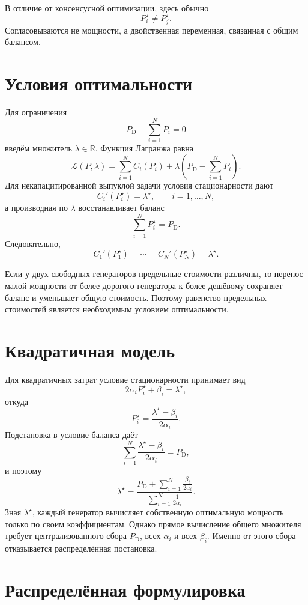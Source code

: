 В отличие от консенсусной оптимизации, здесь обычно
\[
    P_i^\star\ne P_j^\star.
\]
Согласовываются не мощности, а двойственная переменная, связанная с
общим балансом.

\section{Условия оптимальности}

Для ограничения
\[
    P_{\mathrm D}-\sum_{i=1}^{N}P_i=0
\]
введём множитель \(\lambda\in\mathbb R\). Функция Лагранжа равна
\[
    \mathcal L(P,\lambda)
    =
    \sum_{i=1}^{N}C_i(P_i)
    +
    \lambda
    \left(
        P_{\mathrm D}-\sum_{i=1}^{N}P_i
    \right).
\]
Для некапацитированной выпуклой задачи условия стационарности дают
\[
    C_i'(P_i^\star)=\lambda^\star,
    \qquad i=1,\ldots,N,
\]
а производная по \(\lambda\) восстанавливает баланс
\[
    \sum_{i=1}^{N}P_i^\star=P_{\mathrm D}.
\]
Следовательно,
\[
    C_1'(P_1^\star)
    =
    \cdots
    =
    C_N'(P_N^\star)
    =
    \lambda^\star.
\]

Если у двух свободных генераторов предельные стоимости различны, то
перенос малой мощности от более дорогого генератора к более дешёвому
сохраняет баланс и уменьшает общую стоимость. Поэтому равенство
предельных стоимостей является необходимым условием оптимальности.

\section{Квадратичная модель}

Для квадратичных затрат условие стационарности принимает вид
\[
    2\alpha_iP_i^\star+\beta_i=\lambda^\star,
\]
откуда
\[
    P_i^\star
    =
    \frac{\lambda^\star-\beta_i}{2\alpha_i}.
\]
Подстановка в условие баланса даёт
\[
    \sum_{i=1}^{N}
    \frac{\lambda^\star-\beta_i}{2\alpha_i}
    =
    P_{\mathrm D},
\]
и поэтому
\[
    \lambda^\star
    =
    \frac{
        P_{\mathrm D}
        +
        \displaystyle\sum_{i=1}^{N}
        \frac{\beta_i}{2\alpha_i}
    }{
        \displaystyle\sum_{i=1}^{N}
        \frac1{2\alpha_i}
    }.
\]
Зная \(\lambda^\star\), каждый генератор вычисляет собственную
оптимальную мощность только по своим коэффициентам. Однако прямое
вычисление общего множителя требует централизованного сбора
\(P_{\mathrm D}\), всех \(\alpha_i\) и всех \(\beta_i\). Именно от
этого сбора отказывается распределённая постановка.

\section{Распределённая формулировка}

